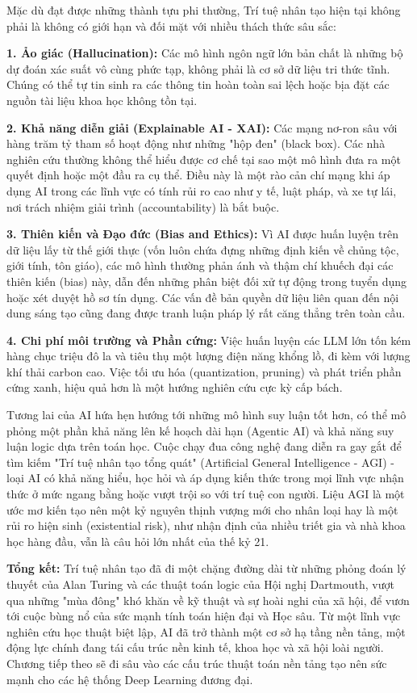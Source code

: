 \documentclass[12pt,a4paper]{article}
\begin{document}
Mặc dù đạt được những thành tựu phi thường, Trí tuệ nhân tạo hiện tại không phải là không có giới hạn và đối mặt với nhiều thách thức sâu sắc:

\textbf{1. Ảo giác (Hallucination):} Các mô hình ngôn ngữ lớn bản chất là những bộ dự đoán xác suất vô cùng phức tạp, không phải là cơ sở dữ liệu tri thức tĩnh. Chúng có thể tự tin sinh ra các thông tin hoàn toàn sai lệch hoặc bịa đặt các nguồn tài liệu khoa học không tồn tại.

\textbf{2. Khả năng diễn giải (Explainable AI - XAI):} Các mạng nơ-ron sâu với hàng trăm tỷ tham số hoạt động như những "hộp đen" (black box). Các nhà nghiên cứu thường không thể hiểu được cơ chế tại sao một mô hình đưa ra một quyết định hoặc một đầu ra cụ thể. Điều này là một rào cản chí mạng khi áp dụng AI trong các lĩnh vực có tính rủi ro cao như y tế, luật pháp, và xe tự lái, nơi trách nhiệm giải trình (accountability) là bắt buộc.

\textbf{3. Thiên kiến và Đạo đức (Bias and Ethics):} Vì AI được huấn luyện trên dữ liệu lấy từ thế giới thực (vốn luôn chứa đựng những định kiến về chủng tộc, giới tính, tôn giáo), các mô hình thường phản ánh và thậm chí khuếch đại các thiên kiến (bias) này, dẫn đến những phân biệt đối xử tự động trong tuyển dụng hoặc xét duyệt hồ sơ tín dụng. Các vấn đề bản quyền dữ liệu liên quan đến nội dung sáng tạo cũng đang được tranh luận pháp lý rất căng thẳng trên toàn cầu.

\textbf{4. Chi phí môi trường và Phần cứng:} Việc huấn luyện các LLM lớn tốn kém hàng chục triệu đô la và tiêu thụ một lượng điện năng khổng lồ, đi kèm với lượng khí thải carbon cao. Việc tối ưu hóa (quantization, pruning) và phát triển phần cứng xanh, hiệu quả hơn là một hướng nghiên cứu cực kỳ cấp bách.

Tương lai của AI hứa hẹn hướng tới những mô hình suy luận tốt hơn, có thể mô phỏng một phần khả năng lên kế hoạch dài hạn (Agentic AI) và khả năng suy luận logic dựa trên toán học. Cuộc chạy đua công nghệ đang diễn ra gay gắt để tìm kiếm "Trí tuệ nhân tạo tổng quát" (Artificial General Intelligence - AGI) - loại AI có khả năng hiểu, học hỏi và áp dụng kiến thức trong mọi lĩnh vực nhận thức ở mức ngang bằng hoặc vượt trội so với trí tuệ con người. Liệu AGI là một ước mơ kiến tạo nên một kỷ nguyên thịnh vượng mới cho nhân loại hay là một rủi ro hiện sinh (existential risk), như nhận định của nhiều triết gia và nhà khoa học hàng đầu, vẫn là câu hỏi lớn nhất của thế kỷ 21.

\vspace{1cm}
\textbf{Tổng kết:}
Trí tuệ nhân tạo đã đi một chặng đường dài từ những phỏng đoán lý thuyết của Alan Turing và các thuật toán logic của Hội nghị Dartmouth, vượt qua những "mùa đông" khó khăn về kỹ thuật và sự hoài nghi của xã hội, để vươn tới cuộc bùng nổ của sức mạnh tính toán hiện đại và Học sâu. Từ một lĩnh vực nghiên cứu học thuật biệt lập, AI đã trở thành một cơ sở hạ tầng nền tảng, một động lực chính đang tái cấu trúc nền kinh tế, khoa học và xã hội loài người. Chương tiếp theo sẽ đi sâu vào các cấu trúc thuật toán nền tảng tạo nên sức mạnh cho các hệ thống Deep Learning đương đại.
\end{document}
